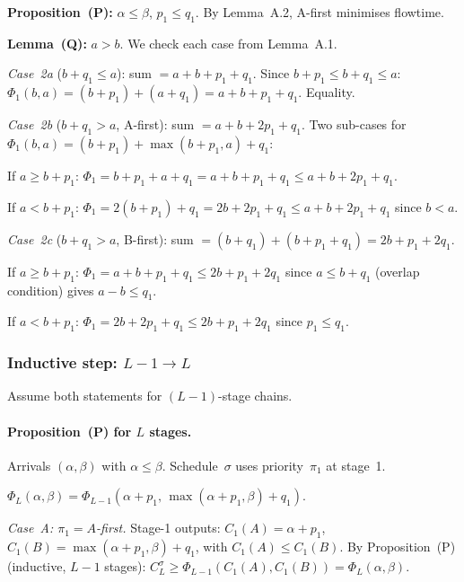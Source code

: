\documentclass[11pt,titlepage]{article}
\begin{document}
\textbf{Proposition~(P):}
$\alpha \leq \beta$, $p_1 \leq q_1$. By
Lemma~A.2, A-first minimises flowtime.

\medskip\noindent
\textbf{Lemma~(Q):} $a > b$. We check each
case from Lemma~A.1.

\emph{Case~2a} ($b + q_1 \leq a$): sum $= a + b + p_1 + q_1$.
Since $b + p_1 \leq b + q_1 \leq a$:
$\Phi_1(b, a) = (b + p_1) + (a + q_1) = a + b + p_1 + q_1$.
Equality. \checkmark

\emph{Case~2b} ($b + q_1 > a$, A-first): sum
$= a + b + 2p_1 + q_1$. Two sub-cases for
$\Phi_1(b, a) = (b + p_1) + \max(b + p_1, a) + q_1$:

If $a \geq b + p_1$:
$\Phi_1 = b + p_1 + a + q_1 = a + b + p_1 + q_1
\leq a + b + 2p_1 + q_1$. \checkmark

If $a < b + p_1$:
$\Phi_1 = 2(b + p_1) + q_1 = 2b + 2p_1 + q_1
\leq a + b + 2p_1 + q_1$ since $b < a$. \checkmark

\emph{Case~2c} ($b + q_1 > a$, B-first): sum
$= (b + q_1) + (b + p_1 + q_1) = 2b + p_1 + 2q_1$.

If $a \geq b + p_1$:
$\Phi_1 = a + b + p_1 + q_1 \leq 2b + p_1 + 2q_1$
since $a \leq b + q_1$ (overlap condition) gives
$a - b \leq q_1$. \checkmark

If $a < b + p_1$:
$\Phi_1 = 2b + 2p_1 + q_1 \leq 2b + p_1 + 2q_1$
since $p_1 \leq q_1$. \checkmark

\subsubsection*{Inductive step: $L - 1 \to L$}

Assume both statements for $(L-1)$-stage chains.

\paragraph{Proposition~(P) for $L$ stages.}

Arrivals $(\alpha, \beta)$ with $\alpha \leq \beta$.
Schedule~$\sigma$ uses priority~$\pi_1$ at stage~1.

$\Phi_L(\alpha, \beta)
= \Phi_{L-1}(\alpha + p_1,\,
\max(\alpha + p_1, \beta) + q_1)$.

\emph{Case~A: $\pi_1 = A$-first.}
Stage-1 outputs: $C_1(A) = \alpha + p_1$,
$C_1(B) = \max(\alpha + p_1, \beta) + q_1$, with
$C_1(A) \leq C_1(B)$.
By Proposition~(P) (inductive, $L-1$ stages):
$C_L^\sigma \geq \Phi_{L-1}(C_1(A), C_1(B))
= \Phi_L(\alpha,\beta)$. \checkmark
\end{document}
